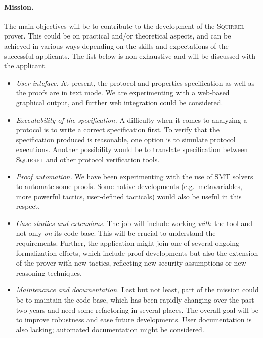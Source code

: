 \documentclass[10pt,a4paper]{article}
\newcommand{\Squirrel}{\textsc{Squirrel}\xspace}
\begin{document}
\paragraph*{Mission.}

The main objectives will be to contribute to the
development of the {\Squirrel} prover. This could be on practical
and/or theoretical aspects, and can be achieved in various ways 
depending on the skills and expectations of the successful applicants. The list 
below is non-exhaustive and will be discussed with the applicant.

\begin{itemize}

\item \emph{User inteface.}
  At present, the protocol and properties specification as well as the
  proofs are in text mode. We are experimenting with a web-based graphical
  output, and further web integration could be considered.

\item \emph{Executability of the specification.} A difficulty when it
  comes to analyzing a protocol is to write a correct specification
  first. To verify that the specification produced is reasonable, one
  option is to simulate protocol executions. Another possibility would be to
  translate specification between \Squirrel and other protocol verification
  tools.

\item \emph{Proof automation.}
  We have been experimenting with the use of SMT solvers to automate
  some proofs. Some native developments (e.g.\ metavariables, more powerful
  tactics, user-defined tacticals) would also be useful in this respect.

\item \emph{Case studies and extensions.}
  The job will include working \emph{with} the tool and not only \emph{on}
  its code base. This will be crucial to understand the requirements.
  Further, the application might join one of several ongoing formalization
  efforts, which include proof developments but also the extension of the
  prover with new tactics, reflecting new security assumptions or new
  reasoning techniques.

\item \emph{Maintenance and documentation.}
  Last but not least, part of the mission could be to maintain the code
  base, which has been rapidly changing over the past two years and need
  some refactoring in several places. The overall goal will be to improve
  robustness and ease future developments.
  User documentation is also lacking; automated documentation
  might be considered.

\end{itemize}
\end{document}
